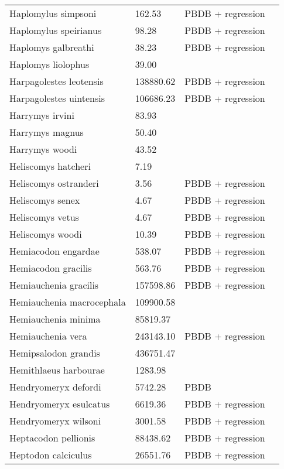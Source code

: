 \documentclass{article}
\begin{document}
\begin{center}
\begin{longtable}{p{} p{} p{} p{}}
    Haplomylus simpsoni & 162.53 & PBDB + regression &  \\ 
    Haplomylus speirianus & 98.28 & PBDB + regression &  \\ 
    Haplomys galbreathi & 38.23 & PBDB + regression &  \\ 
    Haplomys liolophus & 39.00 & \cite{McKenna2011} &  \\ 
    Harpagolestes leotensis & 138880.62 & PBDB + regression &  \\ 
    Harpagolestes uintensis & 106686.23 & PBDB + regression &  \\ 
    Harrymys irvini & 83.93 & \cite{Tomiya2013} &  \\ 
    Harrymys magnus & 50.40 & \cite{Tomiya2013} &  \\ 
    Harrymys woodi & 43.52 & \cite{Kirk2011} &  \\ 
    Heliscomys hatcheri & 7.19 & \cite{Wilson2012} &  \\ 
    Heliscomys ostranderi & 3.56 & PBDB + regression &  \\ 
    Heliscomys senex & 4.67 & PBDB + regression &  \\ 
    Heliscomys vetus & 4.67 & PBDB + regression &  \\ 
    Heliscomys woodi & 10.39 & PBDB + regression &  \\ 
    Hemiacodon engardae & 538.07 & PBDB + regression &  \\ 
    Hemiacodon gracilis & 563.76 & PBDB + regression &  \\ 
    Hemiauchenia gracilis & 157598.86 & PBDB + regression &  \\ 
    Hemiauchenia macrocephala & 109900.58 & \cite{Smith2004} &  \\ 
    Hemiauchenia minima & 85819.37 & \cite{Tomiya2013} &  \\ 
    Hemiauchenia vera & 243143.10 & PBDB + regression &  \\ 
    Hemipsalodon grandis & 436751.47 & \cite{Scott1937} &  \\ 
    Hemithlaeus harbourae & 1283.98 & \cite{Loomis1932} &  \\ 
    Hendryomeryx defordi & 5742.28 & PBDB &  \\ 
    Hendryomeryx esulcatus & 6619.36 & PBDB + regression &  \\ 
    Hendryomeryx wilsoni & 3001.58 & PBDB + regression &  \\ 
    Heptacodon pellionis & 88438.62 & PBDB + regression &  \\ 
    Heptodon calciculus & 26551.76 & PBDB + regression &  \\ 

\end{longtable}
\end{center}
\end{document}
